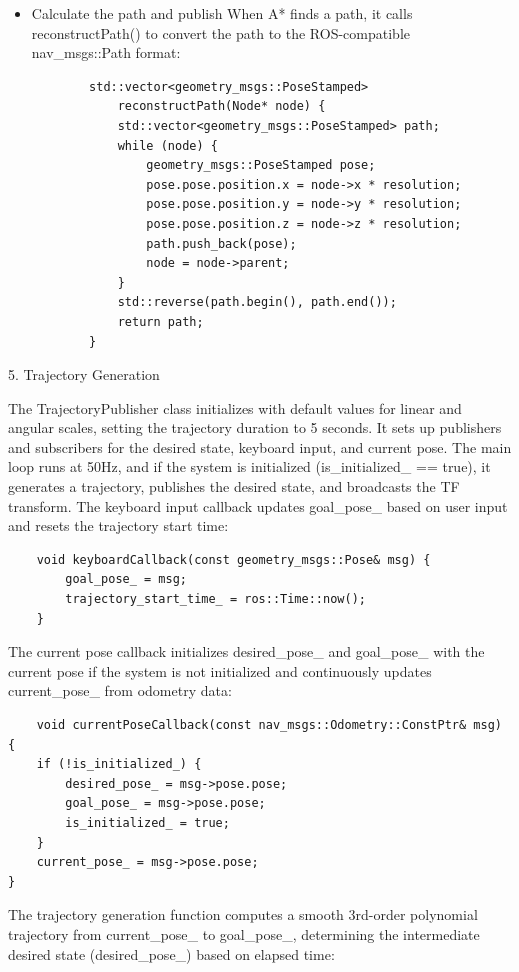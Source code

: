 \documentclass{article}
\begin{document}
\begin{itemize}
\begin{lstlisting}
    \end{lstlisting}

    \item Calculate the path and publish
    When A* finds a path, it calls reconstructPath() to convert the path to the ROS-compatible nav\_msgs::Path format:

    \begin{lstlisting}
        std::vector<geometry_msgs::PoseStamped>
            reconstructPath(Node* node) {
            std::vector<geometry_msgs::PoseStamped> path;
            while (node) {
                geometry_msgs::PoseStamped pose;
                pose.pose.position.x = node->x * resolution;
                pose.pose.position.y = node->y * resolution;
                pose.pose.position.z = node->z * resolution;
                path.push_back(pose);
                node = node->parent;
            }
            std::reverse(path.begin(), path.end());
            return path;
        }

    \end{lstlisting}
    
\end{itemize}

5. Trajectory Generation

The TrajectoryPublisher class initializes with default values for linear and angular scales, setting the trajectory duration to 5 seconds. It sets up publishers and subscribers for the desired state, keyboard input, and current pose. The main loop runs at 50Hz, and if the system is initialized (is\_initialized\_ == true), it generates a trajectory, publishes the desired state, and broadcasts the TF transform. The keyboard input callback updates goal\_pose\_ based on user input and resets the trajectory start time:
\begin{lstlisting}
    void keyboardCallback(const geometry_msgs::Pose& msg) {
        goal_pose_ = msg;
        trajectory_start_time_ = ros::Time::now();
    }
\end{lstlisting}

The current pose callback initializes desired\_pose\_ and goal\_pose\_ with the current pose if the system is not initialized and continuously updates current\_pose\_ from odometry data:
\begin{lstlisting}
    void currentPoseCallback(const nav_msgs::Odometry::ConstPtr& msg) {
    if (!is_initialized_) {
        desired_pose_ = msg->pose.pose;
        goal_pose_ = msg->pose.pose;
        is_initialized_ = true;
    }
    current_pose_ = msg->pose.pose;
}

\end{lstlisting}
The trajectory generation function computes a smooth 3rd-order polynomial trajectory from current\_pose\_ to goal\_pose\_, determining the intermediate desired state (desired\_pose\_) based on elapsed time:
\end{document}
